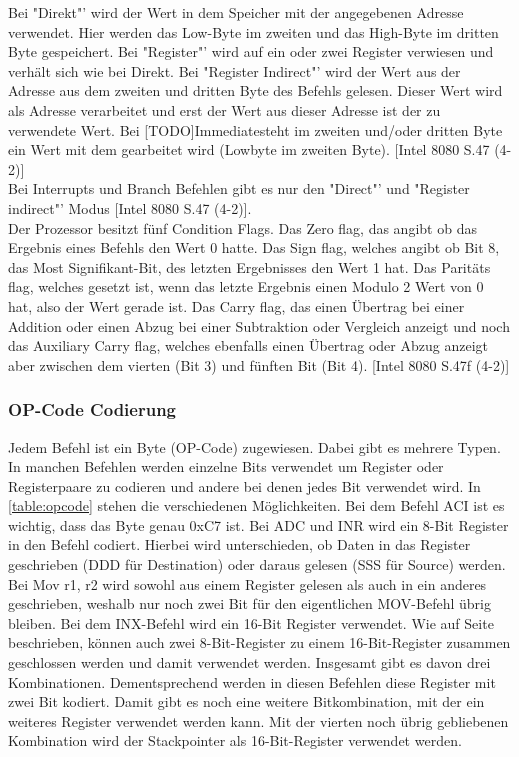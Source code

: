 \documentclass[12pt]{article}
\begin{document}
\noindent
Bei "Direkt"' wird der Wert in dem Speicher mit der angegebenen Adresse verwendet. Hier werden das Low-Byte im zweiten und das High-Byte im dritten Byte gespeichert. Bei "Register"' wird auf ein oder zwei Register verwiesen und verhält sich wie bei Direkt. Bei "Register Indirect"' wird der Wert aus der Adresse aus dem zweiten und dritten Byte des Befehls gelesen. Dieser Wert wird als Adresse verarbeitet und erst der Wert aus dieser Adresse ist der zu verwendete Wert. Bei [TODO]\glqq Immediate\grqq steht 
im zweiten und/oder dritten Byte ein Wert mit dem gearbeitet wird (Lowbyte im zweiten Byte). [Intel 8080 S.47 (4-2)]
\\ 

\noindent
Bei Interrupts und Branch Befehlen gibt es nur den "Direct"' und "Register indirect"' Modus [Intel 8080 S.47 (4-2)]. 
\\ 

\noindent
Der Prozessor besitzt fünf Condition Flags. Das Zero flag, das angibt ob das Ergebnis eines Befehls den Wert 0 hatte. Das Sign flag, welches angibt ob Bit 8, das Most Signifikant-Bit, des letzten Ergebnisses den Wert 1 hat. Das Paritäts flag, welches gesetzt ist, wenn das letzte Ergebnis einen Modulo 2 Wert von 0 hat, also der Wert gerade ist. Das Carry flag, das einen Übertrag bei einer Addition oder einen Abzug bei einer Subtraktion oder Vergleich anzeigt und noch das Auxiliary Carry flag, welches ebenfalls einen Übertrag oder Abzug anzeigt aber zwischen dem vierten (Bit 3) und fünften Bit (Bit 4). [Intel 8080 S.47f (4-2)]
\\

\subsubsection{OP-Code Codierung}
\label{chapter:opcode}
Jedem Befehl ist ein Byte (OP-Code) zugewiesen. Dabei gibt es mehrere Typen. In manchen Befehlen werden einzelne Bits verwendet um Register oder Registerpaare zu codieren und andere bei denen jedes Bit verwendet wird. In \ref{table:opcode} stehen die verschiedenen Möglichkeiten. Bei dem Befehl ACI ist es wichtig, dass das Byte genau 0xC7 ist. Bei ADC und INR wird ein 8-Bit Register in den Befehl codiert. Hierbei wird unterschieden, ob Daten in das Register geschrieben (DDD für Destination) oder daraus gelesen (SSS für Source) werden. Bei Mov r1, r2 wird sowohl aus einem Register gelesen als auch in ein anderes geschrieben, weshalb nur noch zwei Bit für den eigentlichen MOV-Befehl übrig bleiben. Bei dem INX-Befehl wird ein 16-Bit Register verwendet. Wie auf Seite \pageref{RegisterSection} beschrieben, können auch zwei 8-Bit-Register zu einem 16-Bit-Register zusammen geschlossen werden und damit verwendet werden. Insgesamt gibt es davon drei Kombinationen. Dementsprechend werden in diesen Befehlen diese Register mit zwei Bit kodiert. Damit gibt es noch eine weitere Bitkombination, mit der ein weiteres Register verwendet werden kann. Mit der vierten noch übrig gebliebenen Kombination wird der Stackpointer als 16-Bit-Register verwendet werden. 
\end{document}
